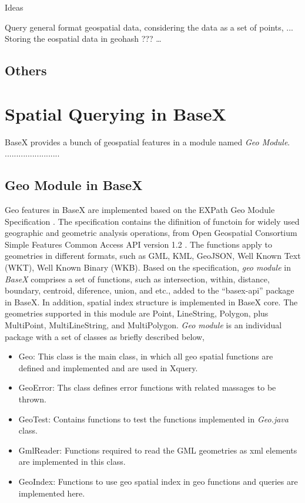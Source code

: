 \documentclass[a4paper,12pt]{article}
\begin{document}
Ideas

Query general format geospatial data, considering the data as a set of points, ...
Storing the eospatial data in geohash ???
…


\subsection{Others}
\newpage

















\section{Spatial Querying in BaseX}
\label{s.basex}
BaseX provides a bunch of geospatial features in a module named \textit{Geo Module}. ........................

\subsection{Geo Module in BaseX}
Geo features in BaseX are implemented based on the EXPath Geo Module Specification \cite{expath}. The specification contains the difinition of functoin for widely used geographic and geometric analysis operations, from Open Geospatial Consortium Simple Features Common Access API version 1.2 \cite{simpleFeature}. The functions apply to geometries in different formats, such as GML, KML, GeoJSON, Well Known Text (WKT), Well Known Binary (WKB). Based on the specification, \textit{geo module} in \textit{BaseX} comprises a set of functions, such as intersection, within, distance, boundary, centroid, diference, union, and etc., added to the “basex-api” package in BaseX. In addition, spatial index structure is implemented in BaseX core. The geometries supported in this module are Point, LineString, Polygon, plus MultiPoint, MultiLineString, and MultiPolygon. \textit{Geo module} is an individual package with a set of classes as briefly described below,
\begin{itemize}
\item Geo: This class is the main class, in which all geo spatial functions are defined and implemented and are used in Xquery.
\item GeoError: Ths class defines error functions with related massages to be thrown.
\item GeoTest: Contains functions to test the functions implemented in \textit{Geo.java} class.
\item GmlReader: Functions required to read the GML geometries as xml elements are implemented in this class.
\item GeoIndex: Functions to use geo spatial index in geo functions and queries are implemented here. 
\end{itemize}
\end{document}
